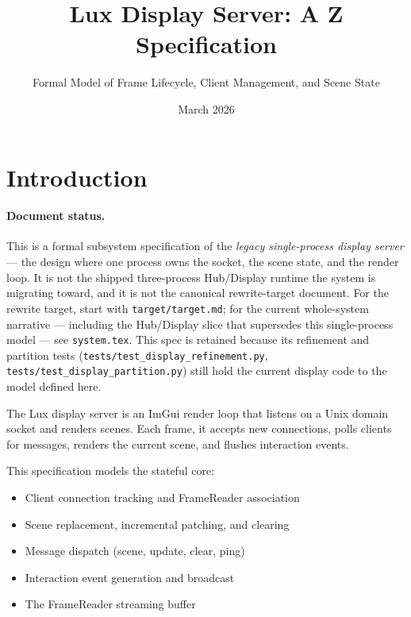 \documentclass[a4paper,10pt,fleqn]{article}
\begin{document}
\title{Lux Display Server: A Z Specification}
\author{Formal Model of Frame Lifecycle, Client Management, and Scene State}
\date{March 2026}
\maketitle

\tableofcontents
\newpage

\section{Introduction}

\paragraph{Document status.}
This is a formal subsystem specification of the \emph{legacy single-process
display server} --- the design where one process owns the socket, the scene
state, and the render loop. It is not the shipped three-process Hub/Display
runtime the system is migrating toward, and it is not the canonical
rewrite-target document. For the rewrite target, start with
\texttt{target/target.md}; for the current whole-system narrative --- including
the Hub/Display slice that supersedes this single-process model --- see
\texttt{system.tex}. This spec is retained because its refinement and partition
tests (\texttt{tests/test\_display\_refinement.py},
\texttt{tests/test\_display\_partition.py}) still hold the current display code
to the model defined here.

The Lux display server is an ImGui render loop that listens on a Unix
domain socket and renders scenes.  Each frame, it accepts new
connections, polls clients for messages, renders the current scene,
and flushes interaction events.

This specification models the stateful core:
\begin{itemize}
  \item Client connection tracking and FrameReader association
  \item Scene replacement, incremental patching, and clearing
  \item Message dispatch (scene, update, clear, ping)
  \item Interaction event generation and broadcast
  \item The FrameReader streaming buffer
\end{itemize}
\end{document}
